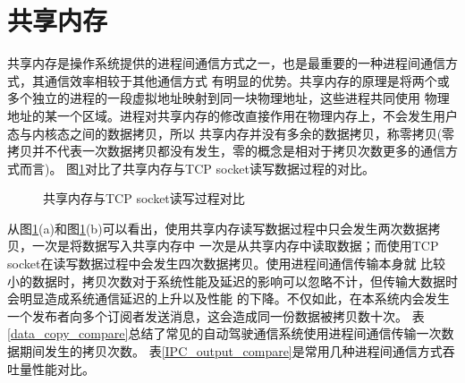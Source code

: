 \section{共享内存}
共享内存是操作系统提供的进程间通信方式之一，也是最重要的一种进程间通信方式，其通信效率相较于其他通信方式
有明显的优势。共享内存的原理是将两个或多个独立的进程的一段虚拟地址映射到同一块物理地址，这些进程共同使用
物理地址的某一个区域。进程对共享内存的修改直接作用在物理内存上，不会发生用户态与内核态之间的数据拷贝，所以
共享内存并没有多余的数据拷贝，称零拷贝(零拷贝并不代表一次数据拷贝都没有发生，零的概念是相对于拷贝次数更多的通信方式而言)。
图\ref{IPC_compare}对比了共享内存与TCP socket读写数据过程的对比。
\begin{figure}[H]
  \centering
  \caption{共享内存与TCP socket读写过程对比}
  \label{IPC_compare}
\end{figure}
从图\ref{IPC_compare}(a)和图\ref{IPC_compare}(b)可以看出，使用共享内存读写数据过程中只会发生两次数据拷贝，一次是将数据写入共享内存中
一次是从共享内存中读取数据；而使用TCP socket在读写数据过程中会发生四次数据拷贝。使用进程间通信传输本身就
比较小的数据时，拷贝次数对于系统性能及延迟的影响可以忽略不计，但传输大数据时会明显造成系统通信延迟的上升以及性能
的下降。不仅如此，在本系统内会发生一个发布者向多个订阅者发送消息，这会造成同一份数据被拷贝数十次。
表\ref{data_copy_compare}总结了常见的自动驾驶通信系统使用进程间通信传输一次数据期间发生的拷贝次数。
表\ref{IPC_output_compare}是常用几种进程间通信方式吞吐量性能对比。
\begin{table}[H]
  \centering\small
  \caption{自动驾驶通信系统数据拷贝次数总结\cite{8968462}}
  \label{data_copy_compare}
\end{table}

